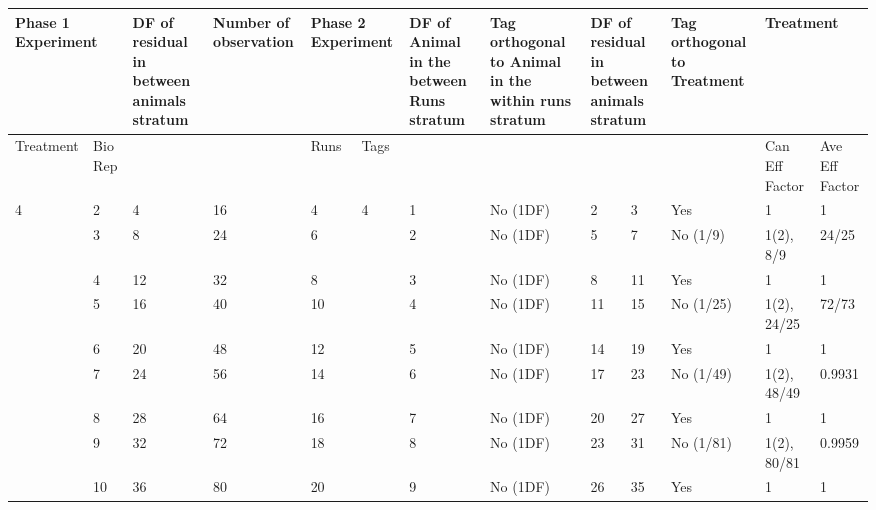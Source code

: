 \begin{tabular}{|p{0.5in}|p{0.3in}|p{0.7in}|p{0.7in}|p{0.3in}|p{0.3in}|p{0.7in}|p{0.7in}|p{0.2in}|p{0.4in}|p{0.6in}|p{0.6in}|p{0.4in}|} \hline 
\multicolumn{2}{|p{1in}|}{Phase 1 Experiment} & DF of residual in between animals stratum & Number of observation  & \multicolumn{2}{|p{0.7in}|}{Phase 2 Experiment} & DF of Animal in the between Runs stratum  & Tag orthogonal to Animal in the within runs stratum & \multicolumn{2}{|p{0.6in}|}{DF of residual in between animals stratum} & Tag orthogonal to Treatment & \multicolumn{2}{|p{1.0in}|}{Treatment} \\ \hline 
Treatment & Bio Rep &  &  & Runs & Tags  &  &  & \multicolumn{2}{|p{0.6in}|}{} &  & Can Eff Factor & Ave Eff Factor \\ \hline 
4 & 2 & 4 & 16 & 4 & 4 & 1 & No (1DF) & 2 & 3 & Yes & 1 & 1 \\ \hline 
 & 3 & 8 & 24 & 6 &  & 2 & No (1DF) & 5 & 7 & No (1/9) & 1(2), 8/9 & 24/25 \\ \hline 
 & 4 & 12 & 32 & 8 &  & 3 & No (1DF) & 8 & 11 & Yes & 1 & 1 \\ \hline 
 & 5 & 16 & 40 & 10 &  & 4 & No (1DF) & 11 & 15 & No (1/25) & 1(2), 24/25 & 72/73 \\ \hline 
 & 6 & 20 & 48 & 12 &  & 5 & No (1DF) & 14 & 19 & Yes & 1 & 1 \\ \hline 
 & 7 & 24 & 56 & 14 &  & 6 & No (1DF) & 17 & 23 & No (1/49) & 1(2), 48/49 & 0.9931 \\ \hline 
 & 8 & 28 & 64 & 16 &  & 7 & No (1DF) & 20 & 27 & Yes & 1 & 1 \\ \hline 
 & 9 & 32 & 72 & 18 &  & 8 & No (1DF) & 23 & 31 & No (1/81) & 1(2), 80/81 & 0.9959 \\ \hline 
 & 10 & 36 & 80 & 20 &  & 9 & No (1DF) & 26 & 35 & Yes & 1 & 1 \\ \hline 
\end{tabular}



